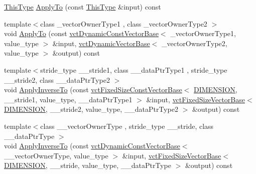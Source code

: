 \begin{DoxyCompactItemize}
\item 
\hyperlink{classvct_quaternion_base_af28efdc38acf89acb7a67afada11408c}{This\-Type} \hyperlink{classvct_quaternion_rotation3_base_ab0bdd0eb7271055fbcbadaea2e2cddaa}{Apply\-To} (const \hyperlink{classvct_quaternion_base_af28efdc38acf89acb7a67afada11408c}{This\-Type} \&input) const 
\item 
{\footnotesize template$<$class \-\_\-vector\-Owner\-Type1 , class \-\_\-vector\-Owner\-Type2 $>$ }\\void \hyperlink{classvct_quaternion_rotation3_base_a818da0e1bd6791417dc16af9f4f55aa5}{Apply\-To} (const \hyperlink{classvct_dynamic_const_vector_base}{vct\-Dynamic\-Const\-Vector\-Base}$<$ \-\_\-vector\-Owner\-Type1, value\-\_\-type $>$ \&input, \hyperlink{classvct_dynamic_vector_base}{vct\-Dynamic\-Vector\-Base}$<$ \-\_\-vector\-Owner\-Type2, value\-\_\-type $>$ \&output) const 
\item 
{\footnotesize template$<$stride\-\_\-type \-\_\-\-\_\-stride1, class \-\_\-\-\_\-data\-Ptr\-Type1 , stride\-\_\-type \-\_\-\-\_\-stride2, class \-\_\-\-\_\-data\-Ptr\-Type2 $>$ }\\void \hyperlink{classvct_quaternion_rotation3_base_ac822156b1d72851cd10fa02726fb616e}{Apply\-Inverse\-To} (const \hyperlink{classvct_fixed_size_const_vector_base}{vct\-Fixed\-Size\-Const\-Vector\-Base}$<$ \hyperlink{classvct_quaternion_rotation3_base_a729ac03acdd5949ecf382629e563d2a0a9417132a8a6849e18439d903ae6a1f18}{D\-I\-M\-E\-N\-S\-I\-O\-N}, \-\_\-\-\_\-stride1, value\-\_\-type, \-\_\-\-\_\-data\-Ptr\-Type1 $>$ \&input, \hyperlink{classvct_fixed_size_vector_base}{vct\-Fixed\-Size\-Vector\-Base}$<$ \hyperlink{classvct_quaternion_rotation3_base_a729ac03acdd5949ecf382629e563d2a0a9417132a8a6849e18439d903ae6a1f18}{D\-I\-M\-E\-N\-S\-I\-O\-N}, \-\_\-\-\_\-stride2, value\-\_\-type, \-\_\-\-\_\-data\-Ptr\-Type2 $>$ \&output) const 
\item 
{\footnotesize template$<$class \-\_\-\-\_\-vector\-Owner\-Type , stride\-\_\-type \-\_\-\-\_\-stride, class \-\_\-\-\_\-data\-Ptr\-Type $>$ }\\void \hyperlink{classvct_quaternion_rotation3_base_a59b85aed1b88591dd44d0be6611a19a0}{Apply\-Inverse\-To} (const \hyperlink{classvct_dynamic_const_vector_base}{vct\-Dynamic\-Const\-Vector\-Base}$<$ \-\_\-\-\_\-vector\-Owner\-Type, value\-\_\-type $>$ \&input, \hyperlink{classvct_fixed_size_vector_base}{vct\-Fixed\-Size\-Vector\-Base}$<$ \hyperlink{classvct_quaternion_rotation3_base_a729ac03acdd5949ecf382629e563d2a0a9417132a8a6849e18439d903ae6a1f18}{D\-I\-M\-E\-N\-S\-I\-O\-N}, \-\_\-\-\_\-stride, value\-\_\-type, \-\_\-\-\_\-data\-Ptr\-Type $>$ \&output) const 

\end{DoxyCompactItemize}
